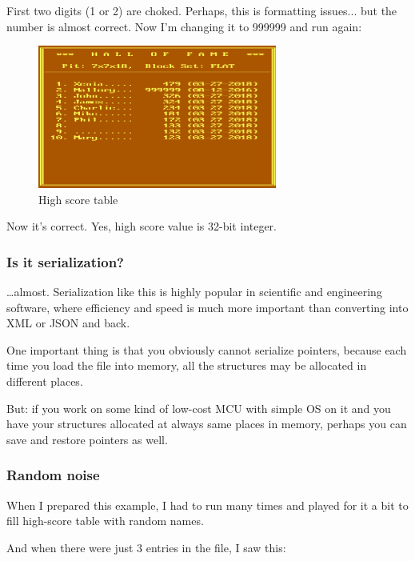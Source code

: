 First two digits (1 or 2) are choked. Perhaps, this is formatting issues... but the number is almost correct.
Now I'm changing it to 999999 and run again:

\begin{figure}[H]
\centering
\includegraphics[width=0.7\textwidth]{advanced/550_more_structs/blockout/hs999999.png}
\caption{High score table}
\end{figure}

Now it's correct. Yes, high score value is 32-bit integer.

\subsubsection{Is it serialization?}

\dots almost.
Serialization like this is highly popular in scientific and engineering software, where efficiency and speed is much more important
than converting into \ac{XML} or \ac{JSON} and back.

One important thing is that you obviously cannot serialize pointers, because each time you load the file into memory,
all the structures may be allocated in different places.

But: if you work on some kind of low-cost \ac{MCU} with simple \ac{OS} on it
and you have your structures allocated at always same
places in memory, perhaps you can save and restore pointers as well.

\subsubsection{Random noise}

When I prepared this example, I had to run  many times and played for it a bit
to fill high-score table with random names.

And when there were just 3 entries in the file, I saw this:

